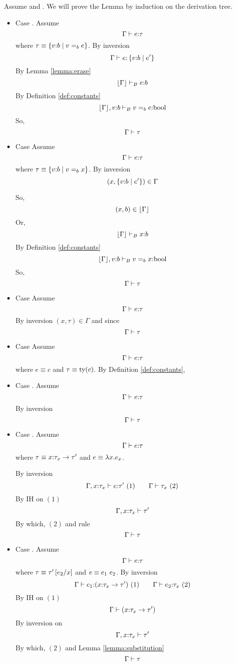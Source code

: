 Assume
\iswellformed{}{\Gamma} and .
We will prove the Lemma by induction on the derivation tree.
\begin{itemize}
\item Case \rtexact. Assume 
$$	\hastype{\Gamma}{e}{\tau} $$
where $\tau\equiv\tref{v}{b}{v \eqb{b} e}$.
By inversion
$$	
\hastype{\Gamma}{e}{\tref{v}{b}{e'}}
$$
By Lemma \ref{lemma:erase}
$$	
\hastypebase{\erase{\Gamma}}{e}{b}
$$
By Definition \ref{def:constants}
$$	
\hastypebase{\erase{\Gamma},v\colon b}{v \eqb{b} e}{\tbool}
$$
So, 
$$	
\iswellformed{\Gamma}{\tau}
$$

\item Case \rtvarbase
Assume 
$$	\hastype{\Gamma}{e}{\tau} $$
where $\tau\equiv\tref{v}{b}{v \eqb{b} x}$.
By inversion
$$	
(x,{\tref{v}{b}{e'}}) \in \Gamma
$$

So, 
$$	
(x,b) \in \erase{\Gamma}
$$
Or,
$$	
\hastypebase{\erase{\Gamma}}{x}{b}
$$
By Definition \ref{def:constants}
$$	
\hastypebase{\erase{\Gamma},v\colon b}{v \eqb{b} x}{\tbool}
$$
So, 
$$	
\iswellformed{\Gamma}{\tau}
$$
\item Case \rtvar
Assume $$\hastype{\Gamma}{e}{\tau}$$
By inversion $(x,\tau)\in \Gamma$ and since \iswellformed{}{\Gamma}
$$	
\iswellformed{\Gamma}{\tau}
$$
\item Case \rtconst
Assume $$\hastype{\Gamma}{e}{\tau}$$
where $e\equiv c$ and $\tau\equiv\ty{c}$.
By Definition \ref{def:constants},

\item Case \rtsub.
Assume 
$$	
	\hastype{\Gamma}{e}{\tau}
$$
By inversion
$$	\iswellformed{\Gamma}{\tau}
$$

\item Case \rtfun.
Assume
$$
	\hastype{\Gamma}{e}{\tau}
$$
where $\tau\equiv\tfun{x}{\tau_x}{\tau'}$ 
and $e\equiv\efun{x}{e_x}$.

By inversion
$$
	\hastype{\Gamma, x\colon\tau_x}{e}{\tau'} \ (1) \qquad
	\iswellformed{\Gamma}{\tau_x}\ (2)
$$
By IH on $(1)$
$$
	\iswellformed{\Gamma, x\colon\tau_x}{\tau'}
$$
By which, $(2)$ and rule \rwfun
$$
	\iswellformed{\Gamma}{\tau}
$$

\item Case \rtapp. Assume
$$
	\hastype{\Gamma}{e}{\tau}
$$
where $\tau\equiv\tau'\sub{x}{e_2}$ 
and $e\equiv\eapp{e_1}{e_2}$.
By inversion
$$
	\hastype{\Gamma}{e_1}{(\tfun{x}{\tau_{x}}{\tau'})}\ (1) \qquad 
	\hastype{\Gamma}{e_2}{\tau_{x}}\ (2)
$$
By IH on $(1)$
$$
	\iswellformed{\Gamma}{(\tfun{x}{\tau_{x}}{\tau'})}
$$
By inversion on \rtapp
$$
	\iswellformed{\Gamma, x\colon\tau_x}{\tau'}
$$
By which, $(2)$ and Lemma \ref{lemma:substitution}
$$
	\iswellformed{\Gamma}{\tau}
$$
\end{itemize}